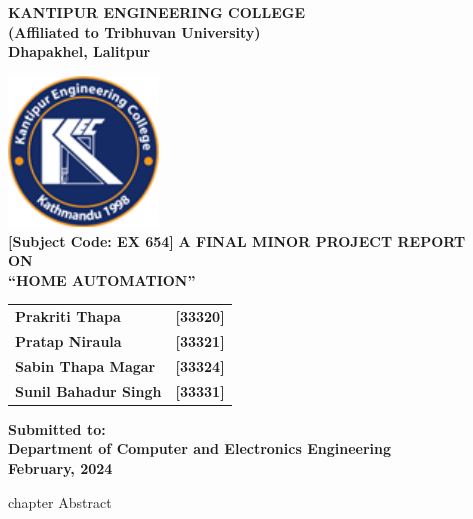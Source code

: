 \documentclass[12pt,a4paper]{report}
\begin{document}
	
	\begin{center}
		\large{
			\textbf{ \Large {KANTIPUR ENGINEERING COLLEGE} \\}
			\textbf{ (Affiliated to Tribhuvan University)\\ Dhapakhel, Lalitpur \\}
			
			
			\vfill
			\includegraphics[width=0.3\textwidth]{images//logo.png} \\
			
			\vfill
			\textbf{[Subject Code: EX 654]}
			\vfill
			\textbf{ A FINAL MINOR PROJECT  REPORT \\ ON\\ \large{``HOME AUTOMATION''} }
			
			\vfill
			
			
			\begin{tabular}{l l}
				\textbf{Prakriti Thapa} &  \textbf{[33320]} \\
				\textbf{Pratap Niraula} & \textbf{[33321]} \\
				\textbf{Sabin Thapa Magar} & \textbf{[33324]} \\
				\textbf{Sunil Bahadur Singh} & \textbf{[33331] }
				
			\end{tabular}
			
			
			
			
			\vfill
			
			
			\textbf{Submitted to:\\
				Department of Computer and Electronics Engineering\\
				\vfill
				February, 2024
			}
		}
	\end{center}
	
	
	\pagebreak
	 {chapter} {Abstract}
	\thispagestyle{plain}
	
\end{document}
